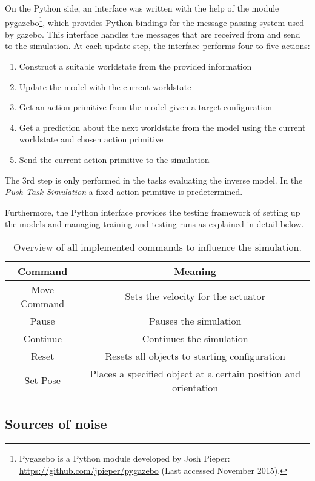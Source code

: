 On the Python side, an interface was written with the help of the module  pygazebo\footnote{Pygazebo is a Python module developed by Josh Pieper: \url{https://github.com/jpieper/pygazebo} (Last accessed November 2015).}, which provides Python bindings for the message passing system used by gazebo. This interface handles the messages that are received from and send to the simulation. 
At each update step, the interface performs four to five actions:
\begin{enumerate}
\item Construct a suitable worldstate from the provided information
\item Update the model with the current worldstate
\item Get an action primitive from the model given a target configuration
\item Get a prediction about the next worldstate from the model using the current worldstate and chosen action primitive
\item Send the current action primitive to the simulation
\end{enumerate}

The 3rd step is only performed in the tasks evaluating the inverse model. In the \textit{Push Task Simulation} a fixed action primitive is predetermined.

Furthermore, the Python interface provides the testing framework of setting up the models and managing training and testing runs as explained in detail below.

\begin{table}
	\centering
	\begin{tabular}{|c|c|}
		\hline \textbf{Command} & \textbf{Meaning} \\ 
		\hline Move Command & Sets the velocity for the actuator \\ 
		\hline Pause & Pauses the simulation \\
		\hline Continue & Continues the simulation \\
		\hline Reset & Resets all objects to starting configuration \\
		\hline Set Pose & Places a specified object at a certain position and orientation \\
		\hline
	\end{tabular} 
	\caption{Overview of all implemented commands to influence the simulation.}
	\label{tab:commands}
\end{table}

\subsection{Sources of noise \label{sec:noise}}


